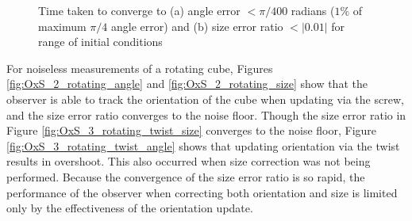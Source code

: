 \begin{figure}
{\begin{minipage}[b]{0.45\columnwidth}
 	\end{minipage}}
 	\caption{Time taken to converge to (a) angle error $< \pi/400$ radians ($1\%$ of maximum $\pi/4$ angle error) and (b) size error ratio $< |0.01|$ for range of initial conditions}
 	\label{fig:convergence}
\end{figure}
     
For noiseless measurements of a rotating cube, Figures \ref{fig:OxS_2_rotating_angle} and \ref{fig:OxS_2_rotating_size} show that the observer is able to track the orientation of the cube when updating via the screw, and the size error ratio converges to the noise floor.
Though the size error ratio in Figure \ref{fig:OxS_3_rotating_twist_size} converges to the noise floor, Figure \ref{fig:OxS_3_rotating_twist_angle} shows that updating orientation via the twist results in overshoot. This also occurred when size correction was not being performed.
Because the convergence of the size error ratio is so rapid, the performance of the observer when correcting both orientation and size is limited only by the effectiveness of the orientation update.

